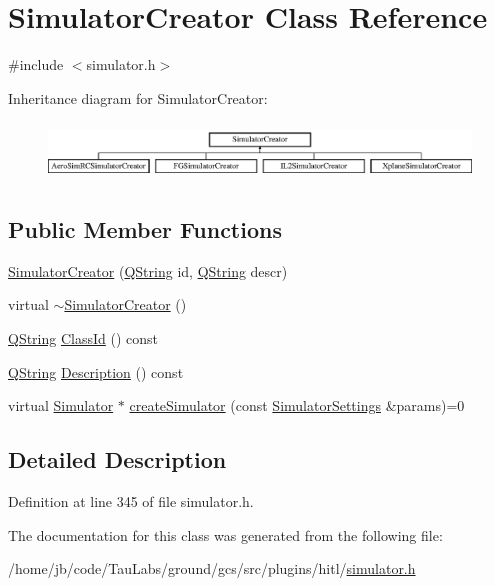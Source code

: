 \hypertarget{class_simulator_creator}{\section{\-Simulator\-Creator \-Class \-Reference}
\label{class_simulator_creator}
}


{\ttfamily \#include $<$simulator.\-h$>$}

\-Inheritance diagram for \-Simulator\-Creator\-:\begin{figure}[H]
\begin{center}
\leavevmode
\includegraphics[height=1.555556cm]{class_simulator_creator}
\end{center}
\end{figure}
\subsection*{\-Public \-Member \-Functions}
\begin{DoxyCompactItemize}
\item 
\hyperlink{group___h_i_t_l_plugin_gad78ac7b6a64456e259fcb9aba94f4947}{\-Simulator\-Creator} (\hyperlink{group___u_a_v_objects_plugin_gab9d252f49c333c94a72f97ce3105a32d}{\-Q\-String} id, \hyperlink{group___u_a_v_objects_plugin_gab9d252f49c333c94a72f97ce3105a32d}{\-Q\-String} descr)
\item 
virtual \hyperlink{group___h_i_t_l_plugin_ga07d44da289771bf1bc8cf9dd01d5cb13}{$\sim$\-Simulator\-Creator} ()
\item 
\hyperlink{group___u_a_v_objects_plugin_gab9d252f49c333c94a72f97ce3105a32d}{\-Q\-String} \hyperlink{group___h_i_t_l_plugin_ga4195682a513bc0ddf6818ff4058d2619}{\-Class\-Id} () const 
\item 
\hyperlink{group___u_a_v_objects_plugin_gab9d252f49c333c94a72f97ce3105a32d}{\-Q\-String} \hyperlink{group___h_i_t_l_plugin_ga1ace675dc4a400f644b7e6f7506f65e9}{\-Description} () const 
\item 
virtual \hyperlink{class_simulator}{\-Simulator} $\ast$ \hyperlink{group___h_i_t_l_plugin_ga2511a02773cadaf9c503a89172622837}{create\-Simulator} (const \hyperlink{group___h_i_t_l_plugin_ga052199f1328d3002bce3e45345aa7f4e}{\-Simulator\-Settings} \&params)=0
\end{DoxyCompactItemize}


\subsection{\-Detailed \-Description}


\-Definition at line 345 of file simulator.\-h.



\-The documentation for this class was generated from the following file\-:\begin{DoxyCompactItemize}
\item 
/home/jb/code/\-Tau\-Labs/ground/gcs/src/plugins/hitl/\hyperlink{simulator_8h}{simulator.\-h}\end{DoxyCompactItemize}

